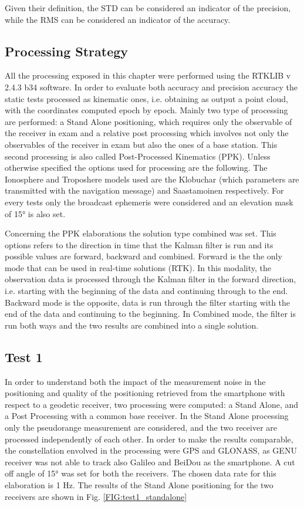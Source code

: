 Given their definition, the STD can be considered an indicator of the precision, while the RMS can be considered an indicator of the accuracy.

\subsection{Processing Strategy}


All the processing exposed in this chapter were performed using the RTKLIB v 2.4.3 b34 software. In order to evaluate both accuracy and precision  accuracy the static tests processed as kinematic ones, i.e. obtaining as output a point cloud, with the coordinates computed epoch by epoch. Mainly two type of processing are performed: a Stand Alone positioning, which requires only the observable of the receiver in exam and a relative post processing which involves not only the observables of the receiver in exam but also the ones of a base station. This second processing is also called Post-Processed Kinematics (PPK). Unless otherwise specified the options used for processing are the following. 
The Ionosphere and Troposhere models used are the Klobuchar \cite{Klobuchar:1987} (which parameters are transmitted with the navigation message) and Saastamoinen \cite{Saastamoinen} respectively. For every tests only the broadcast ephemeris were considered and an elevation mask of \ang{15} is also set. 

Concerning the PPK elaborations the solution type combined was set. This options refers to the direction in time that the Kalman filter is run and its possible values are forward, backward and combined. Forward is the the only mode that can be used in real-time solutions (RTK). In this modality, the observation data is processed through the Kalman filter in the forward direction, i.e. starting with the beginning of the data and continuing through to the end. Backward mode is the opposite,  data is run through the filter starting with the end of the data and continuing to the beginning. In Combined mode, the filter is run both ways and the two results are combined into a single solution.


\subsection{Test 1}
In order to understand both the impact of the measurement noise in the positioning and quality of the positioning retrieved from the smartphone with respect to a geodetic receiver, two processing were computed: a Stand Alone, and a Post Processing with a common base receiver. In the Stand Alone processing only the pseudorange measurement are considered, and the two receiver are processed independently of each other. In order to make the results comparable, the constellation envolved in the processing were GPS and GLONASS, as GENU receiver was not able to track also Galileo and BeiDou as the smartphone. A cut off angle of \ang{15} was set for both the receivers. The chosen data rate for this elaboration is 1 Hz.
The results of the Stand Alone positioning for the two receivers are shown in Fig. \ref{FIG:test1_standalone}

